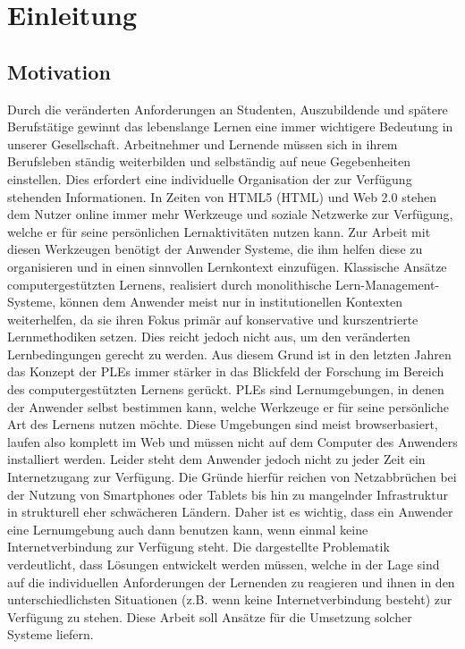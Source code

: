 \chapter{Einleitung}\label{chapter:Kapitel1}

\section{Motivation}
Durch die veränderten Anforderungen an Studenten, Auszubildende und spätere Berufstätige gewinnt das lebenslange Lernen eine immer wichtigere Bedeutung in unserer Gesellschaft. Arbeitnehmer und Lernende müssen sich in ihrem Berufsleben ständig weiterbilden und selbständig auf neue Gegebenheiten einstellen. Dies erfordert eine individuelle Organisation der zur Verfügung stehenden Informationen. In Zeiten von HTML5 (\acl{HTML})  und Web 2.0 stehen dem Nutzer online immer mehr Werkzeuge und soziale Netzwerke zur Verfügung, welche er für seine persönlichen Lernaktivitäten nutzen kann. Zur Arbeit mit diesen Werkzeugen benötigt der Anwender Systeme, die ihm helfen diese zu organisieren und in einen sinnvollen Lernkontext einzufügen. Klassische Ansätze computergestützten Lernens, realisiert durch monolithische Lern-Management-Systeme, können dem Anwender meist nur in institutionellen Kontexten weiterhelfen, da sie ihren Fokus primär auf konservative und kurszentrierte Lernmethodiken setzen. Dies reicht jedoch nicht aus, um den veränderten Lernbedingungen gerecht zu werden. Aus diesem Grund ist in den letzten Jahren das Konzept der \acp{PLE} immer stärker in das Blickfeld der Forschung im Bereich des computergestützten Lernens gerückt. \acp{PLE} sind Lernumgebungen, in denen der Anwender selbst bestimmen kann, welche Werkzeuge er für seine persönliche Art des Lernens nutzen möchte. Diese Umgebungen sind meist browserbasiert, laufen also komplett im Web und müssen nicht auf dem Computer des Anwenders installiert werden. 
Leider steht dem Anwender jedoch nicht zu jeder Zeit ein Internetzugang zur Verfügung. Die Gründe hierfür reichen von Netzabbrüchen bei der Nutzung von Smartphones oder Tablets bis hin zu mangelnder Infrastruktur in strukturell eher schwächeren Ländern. Daher ist es wichtig, dass ein Anwender eine Lernumgebung auch dann benutzen kann, wenn einmal keine Internetverbindung zur Verfügung steht. Die dargestellte Problematik verdeutlicht, dass Lösungen entwickelt werden müssen, welche in der Lage sind auf die individuellen Anforderungen der Lernenden zu reagieren und ihnen in den unterschiedlichsten Situationen (z.B. wenn keine Internetverbindung besteht) zur Verfügung zu stehen. Diese Arbeit soll Ansätze für die Umsetzung solcher Systeme liefern.

